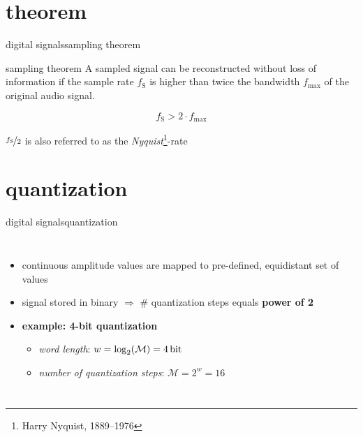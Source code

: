     \section{theorem}
        \begin{frame}{digital signals}{sampling theorem}
            \toremember{}
            
            \begin{block}{sampling theorem}
                A sampled signal can be reconstructed without loss of information if the sample rate $f_\mathrm{S}$ is higher than twice the bandwidth $f_\mathrm{max}$ of the original audio signal.
                
                \begin{equation*}
                    f_\mathrm{S} > 2\cdot f_\mathrm{max}
                \end{equation*}
            \end{block}
            
            \bigskip
            $\nicefrac{f_\mathrm{S}}{2}$ is also referred to as the \textit{Nyquist}\footnote{\tiny Harry Nyquist, 1889--1976}-rate
        \end{frame}	
    
    
    \section{quantization}
        \begin{frame}{digital signals}{quantization}
            \vspace{-3mm}
            \begin{columns}
            \begin{itemize}
                \item   continuous amplitude values are mapped to pre-defined, equidistant set of values
                \item<1->   signal stored in binary $\Rightarrow$ \# quantization steps equals \textbf{power of 2}
                \smallskip
                \item<2->   \textbf{example: 4-bit quantization}
                    \begin{itemize}
                        \item	\textit{word length}: $w = \log_2(\mathcal{M}) = \unit[4]{bit}$
                        \item	\textit{number of quantization steps}: $\mathcal{M} = 2^w = 16$
                    \end{itemize}
            \end{itemize}
            \end{columns}
        \end{frame}	

